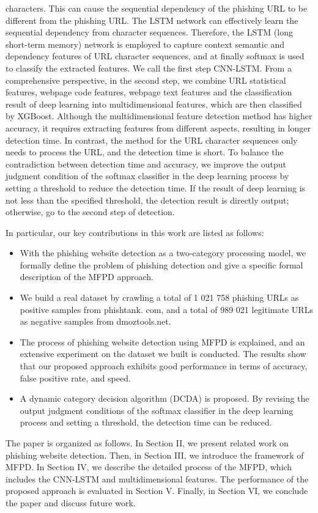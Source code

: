 \documentclass{ieeeaccess}
\begin{document}
characters. This can cause the sequential dependency of the
phishing URL to be different from the phishing URL. The
LSTM network can effectively learn the sequential dependency
from character sequences. Therefore, the LSTM (long
short-term memory) network is employed to capture context
semantic and dependency features of URL character
sequences, and at finally softmax is used to classify the
extracted features. We call the first step CNN-LSTM. From
a comprehensive perspective, in the second step, we combine
URL statistical features, webpage code features, webpage
text features and the classification result of deep learning
into multidimensional features, which are then classified by
XGBoost. Although the multidimensional feature detection method has higher accuracy, it requires extracting features
from different aspects, resulting in longer detection time.
In contrast, the method for the URL character sequences
only needs to process the URL, and the detection time is
short. To balance the contradiction between detection time
and accuracy, we improve the output judgment condition of
the softmax classifier in the deep learning process by setting
a threshold to reduce the detection time. If the result of deep
learning is not less than the specified threshold, the detection
result is directly output; otherwise, go to the second step of
detection.\par In particular, our key contributions in this work are listed
as follows:
\begin{itemize}
  \item With the phishing website detection as a two-category
processing model, we formally define the problem of
phishing detection and give a specific formal description
of the MFPD approach.
  \item We build a real dataset by crawling a total of 1 021
758 phishing URLs as positive samples from phishtank.
com, and a total of 989 021 legitimate URLs as
negative samples from dmoztools.net.
  \item The process of phishing website detection using MFPD
is explained, and an extensive experiment on the dataset
we built is conducted. The results show that our proposed
approach exhibits good performance in terms of
accuracy, false positive rate, and speed.
  \item A dynamic category decision algorithm (DCDA) is proposed.
By revising the output judgment conditions of
the softmax classifier in the deep learning process and
setting a threshold, the detection time can be reduced.
\end{itemize}\par
The paper is organized as follows. In Section II,
we present related work on phishing website detection.
Then, in Section III, we introduce the framework of MFPD.
In Section IV, we describe the detailed process of the MFPD,
which includes the CNN-LSTM and multidimensional features.
The performance of the proposed approach is evaluated
in Section V. Finally, in Section VI, we conclude the paper
and discuss future work.
\end{document}
